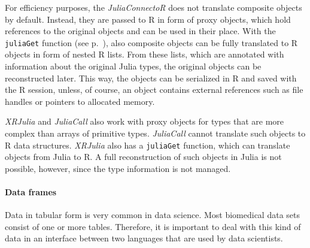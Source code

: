 \documentclass[12pt]{article}
\newcommand{\inlinecode}[1]{\texttt{#1}}
\newcommand{\apkg}[1]{\emph{#1}}
\begin{document}
For efficiency purposes, the \apkg{JuliaConnectoR} does not translate composite objects by default.
Instead, they are passed to R in form of proxy objects, which hold references to the original objects and can be used in their place.
With the \inlinecode{juliaGet} function (see p.~\pageref{rdokitem_juliaGet}), also composite objects can be fully translated to R objects in form of nested R lists.
From these lists, which are annotated with information about the original Julia types, the original objects can be reconstructed later.
This way, the objects can be serialized in R and saved with the R session, unless, of course, an object contains external references such as file handles or pointers to allocated memory.

\apkg{XRJulia} and \apkg{JuliaCall} also work with proxy objects for types that are more complex than arrays of primitive types.
\apkg{JuliaCall} cannot translate such objects to R data structures.
\apkg{XRJulia} also has a \inlinecode{juliaGet} function, which can translate objects from Julia to R.
A full reconstruction of such objects in Julia is not possible, however, since the type information is not managed.


\paragraph{Data frames}\label{juliaconnectordataframes}

Data in tabular form is very common in data science. Most biomedical data sets consist of one or more tables.
Therefore, it is important to deal with this kind of data in an interface between two languages that are used by data scientists.
\end{document}
